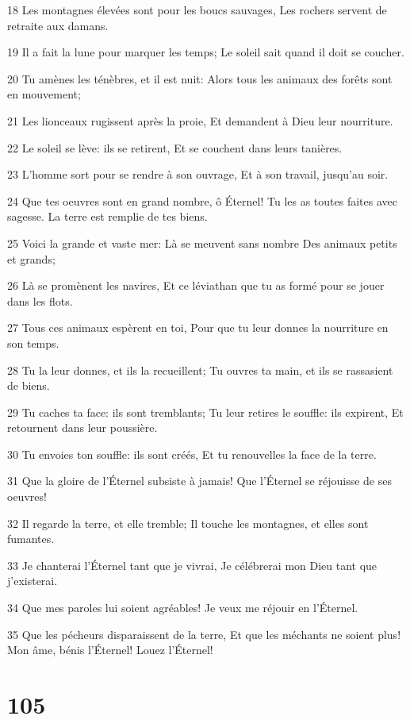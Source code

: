 \par 18 Les montagnes élevées sont pour les boucs sauvages, Les rochers servent de retraite aux damans.
\par 19 Il a fait la lune pour marquer les temps; Le soleil sait quand il doit se coucher.
\par 20 Tu amènes les ténèbres, et il est nuit: Alors tous les animaux des forêts sont en mouvement;
\par 21 Les lionceaux rugissent après la proie, Et demandent à Dieu leur nourriture.
\par 22 Le soleil se lève: ils se retirent, Et se couchent dans leurs tanières.
\par 23 L'homme sort pour se rendre à son ouvrage, Et à son travail, jusqu'au soir.
\par 24 Que tes oeuvres sont en grand nombre, ô Éternel! Tu les as toutes faites avec sagesse. La terre est remplie de tes biens.
\par 25 Voici la grande et vaste mer: Là se meuvent sans nombre Des animaux petits et grands;
\par 26 Là se promènent les navires, Et ce léviathan que tu as formé pour se jouer dans les flots.
\par 27 Tous ces animaux espèrent en toi, Pour que tu leur donnes la nourriture en son temps.
\par 28 Tu la leur donnes, et ils la recueillent; Tu ouvres ta main, et ils se rassasient de biens.
\par 29 Tu caches ta face: ils sont tremblants; Tu leur retires le souffle: ils expirent, Et retournent dans leur poussière.
\par 30 Tu envoies ton souffle: ils sont créés, Et tu renouvelles la face de la terre.
\par 31 Que la gloire de l'Éternel subsiste à jamais! Que l'Éternel se réjouisse de ses oeuvres!
\par 32 Il regarde la terre, et elle tremble; Il touche les montagnes, et elles sont fumantes.
\par 33 Je chanterai l'Éternel tant que je vivrai, Je célébrerai mon Dieu tant que j'existerai.
\par 34 Que mes paroles lui soient agréables! Je veux me réjouir en l'Éternel.
\par 35 Que les pécheurs disparaissent de la terre, Et que les méchants ne soient plus! Mon âme, bénis l'Éternel! Louez l'Éternel!

\chapter{105}

